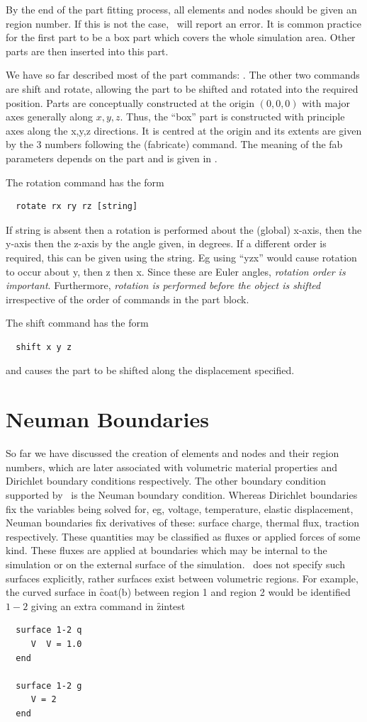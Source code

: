 \documentclass[a4paper,twoside,11pt]{book}
\begin{document}
By the end of the part fitting process, all elements and nodes should
be given an region number. If this is not the case, \zmesh\ will
report an error. It is common practice for the first part to be a box
part which covers the whole simulation area. Other parts are then
inserted into this part.

We have so far described most of the part commands: . The other two commands are shift and rotate,
allowing the part to be shifted and rotated into the required
position. Parts are conceptually constructed at the origin $(0,0,0)$
with major axes generally along $x,y,z$. Thus, the ``box'' part is
constructed with principle axes along the x,y,z directions. It is
centred at the origin and its extents are given by the 3 numbers
following the  (fabricate) command. The meaning of the fab
parameters depends on the part and is given in .

The rotation command has the form
\begin{verbatim}
  rotate rx ry rz [string]
\end{verbatim}
If string is absent then a rotation is performed about the (global)
x-axis, then the y-axis then the z-axis by the angle given, in
degrees. If a different order is required, this can be given using the
string. Eg using ``yzx'' would cause rotation to occur about y, then z
then x. Since these are Euler angles, \emph{rotation order is
  important}. Furthermore, \emph{rotation is performed before the
  object is shifted} irrespective of the order of commands in the part
block.

The shift command has the form
\begin{verbatim}
  shift x y z
\end{verbatim}
and causes the part to be shifted along the displacement specified.

\section{Neuman Boundaries}
\label{neumanbc}

So far we have discussed the creation of elements and nodes and their
region numbers, which are later associated with volumetric material
properties and Dirichlet boundary conditions respectively. The other
boundary condition supported by \zinc\ is the Neuman boundary
condition. Whereas Dirichlet boundaries fix the variables being solved
for, eg, voltage, temperature, elastic displacement, Neuman boundaries
fix derivatives of these: surface charge, thermal flux, traction
respectively. These quantities may be classified as fluxes or applied
forces of some kind. These fluxes are applied at boundaries which may
be internal to the simulation or on the external surface of the
simulation. \zmesh\ does not specify such surfaces explicitly, rather
surfaces exist between volumetric regions.  For example, the curved
surface in \f{coat}(b) between region 1 and region 2 would be
identified $1-2$ giving an extra command in \f{zintest}
\begin{verbatim}
  surface 1-2 q
     V  V = 1.0
  end

  surface 1-2 g
     V = 2
  end
\end{verbatim}
\end{document}

